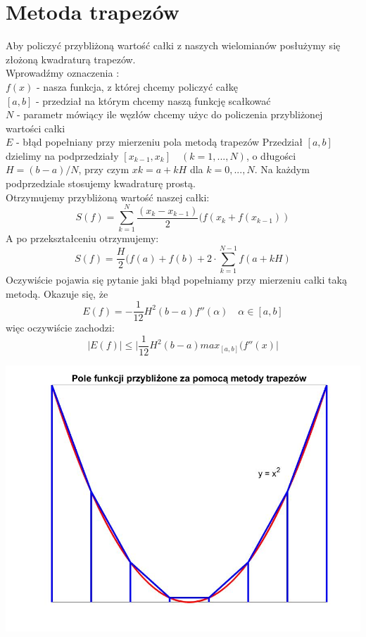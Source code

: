 \documentclass{article}\usepackage{amsmath,amsfonts,amssymb}
\begin{document}
\section{Metoda trapezów}
Aby policzyć przybliżoną wartość całki z naszych wielomianów posłużymy się złożoną kwadraturą trapezów. \\ 
Wprowadźmy oznaczenia : \\
\boldmath
$f(x)$ - nasza funkcja, z której chcemy policzyć całkę \\ 
$[a, b]$ -  przedział na którym chcemy naszą funkcję scałkować \\
$N$ - parametr mówiący ile węzłów chcemy użyc do policzenia przybliżonej wartości całki \\ 
$E$ - błąd popełniany przy mierzeniu pola metodą trapezów
\unboldmath
Przedział $[a, b]$ dzielimy na podprzedziały $[x_{k−1}, x_{k}] \quad (k = 1, . . . , N)$, o długości $H =(b−a)/N$,
przy czym $xk = a+kH $ dla $k = 0, . . . , N$. Na każdym podprzedziale stosujemy kwadraturę prostą.\\
Otrzymujemy przybliżoną wartość naszej całki:
\[ S(f) = \sum_{k=1}^{N}\frac{(x_{k} - x_{k - 1})}{2}  (f(x_{k} + f(x_{k - 1})) \] 
A po przekształceniu otrzymujemy:
\[ S(f) = \frac{H}{2}(f(a) + f(b) +  2\cdot\sum_{k=1}^{N-1}f(a + kH)\] 
Oczywiście pojawia się pytanie jaki błąd popełniamy przy mierzeniu całki taką metodą. Okazuje się, że
\[ E(f) = -\frac{1}{12}H^2(b-a)f''(\alpha) \quad \alpha \in [a,b]\] 
więc oczywiście zachodzi:
\[ \lvert E(f) \rvert \leq \lvert\frac{1}{12}H^2(b-a)max_{[a,b]}(f''(x) \rvert \] 
\begin{center}
   \includegraphics[scale=0.3]{kwadratowa_1.jpg}
\end{center}
\end{document}
